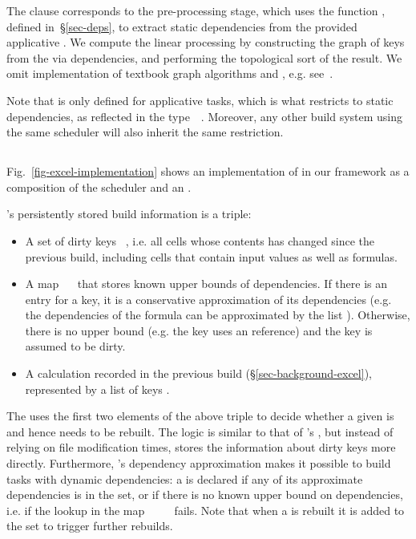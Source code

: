 The  clause corresponds to the pre-processing stage, which uses the
function , defined in~\S\ref{sec-deps}, to extract static
dependencies from the provided applicative . We compute the linear
processing  by constructing the graph of keys  from the
 via dependencies, and performing the topological sort of the result.
We omit implementation of textbook graph algorithms
 and , e.g. see~\cite{cormen2001introduction}.

Note that  is only defined for applicative tasks, which is what
restricts \Make to static dependencies, as reflected in the
type~~. Moreover, any other build system using
the same  scheduler will also inherit the same restriction.

\subsection{\Excel}\label{sec-implementation-excel}

Fig.~\ref{fig-excel-implementation} shows an implementation of \Excel in our
framework as a composition of the  scheduler and an
.

\Excel's persistently stored build information is a triple:

\begin{itemize}
    \item A set of dirty keys ~, i.e. all cells whose contents
          has changed since the previous build, including cells that contain
          input values as well as formulas.
    \item A map ~~\hs{[@@k]} that stores known upper bounds of
          dependencies. If there is an entry for a key, it is a conservative
          approximation of its dependencies (e.g. the dependencies of the
          formula  can be approximated by the list
          \hs{[}\hs{,}\hs{,}\hs{]}). Otherwise, there is
          no upper bound (e.g. the key uses an  reference) and
          the key is assumed to be dirty.
    \item A calculation  recorded in the previous build
          (\S\ref{sec-background-excel}), represented by a list of keys \hs{[@@k]}.
\end{itemize}

The  uses the first two elements of the above triple
to decide whether a given  is  and hence needs to be rebuilt.
The logic is similar to that of \Make's , but instead of
relying on file modification times, \Excel stores the information about dirty
keys more directly. Furthermore, \Excel's dependency approximation makes it
possible to build tasks with dynamic dependencies: a  is declared
 if any of its approximate dependencies is in the  set,
or if there is no known upper bound on dependencies, i.e. if the lookup in the
map ~\hs{::}~~~\hs{[@@k]} fails. Note that when a
 is rebuilt it is added to the  set to trigger further
rebuilds.

